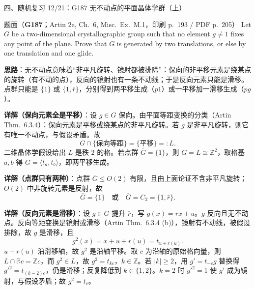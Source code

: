 \documentclass[aspectratio=169,10pt,fontset=none]{ctexbeamer}
\newcommand{\ex}[1]{\textcolor{accent}{\footnotesize\bfseries #1}}
\newcommand{\key}[1]{\textcolor{ink}{\bfseries #1}}
\begin{document}
\begin{frame}[t]{四、随机复习 12/21：G187 无不动点的平面晶体学群（上）}
\label{ex:G187}
\scriptsize
\begin{block}{\footnotesize 题面（\ex{G187}；Artin 2e, Ch.~6, Misc.\ Ex.~M.1，印刷 p.~193 / PDF p.~205）}
Let $G$ be a two-dimensional crystallographic group such that no element $g\ne1$ fixes any point of the plane. Prove that $G$ is generated by two translations, or else by one translation and one glide.
\end{block}
\key{思路}：无不动点意味着“非平凡旋转、镜射都被排除”：保向的非平移元素是绕某点的旋转（有不动的点），反向的镜射也有一条不动线；于是反向元素只能是滑移。点群只能是 $\{1\}$ 或 $\{1,\bar r\}$，分别得到两平移生成（$p1$）或一平移加一滑移生成（$pg$）。

\key{详解（保向元素全是平移）}：设 $g\in G$ 保向。由平面等距变换的分类（Artin Thm.~6.3.4）：保向元素是平移或绕某点的非平凡旋转。若 $g$ 是非平凡旋转，则它有唯一不动点，与假设矛盾。故
\[ G\cap\{\text{保向等距}\}=\{\text{平移}\}=:L . \]
二维晶体学假设给出 $L$ 是秩 $2$ 的格。若点群 $\overline G=\{1\}$，则 $G=L\cong\mathbb Z^2$，取格基 $a,b$ 得 $G=\langle t_a,t_b\rangle$，即两平移生成。

\key{详解（点群只有两种）}：点群 $\overline G\le O(2)$ 有限，且由上面论证不含非平凡旋转；$O(2)$ 中非旋转元素是反射，故
\[ \overline G=\{1\}\quad\text{或}\quad \overline G=C_2=\{1,\bar r\} . \]

\key{详解（反向元素是滑移）}：设 $g\in G$ 提升 $\bar r$，写 $g(x)=rx+u$。$g$ 反向且无不动点。反向等距变换是镜射或滑移（Artin Thm.~6.3.4 (b)），镜射有不动线，被假设排除，故 $g$ 是滑移，且
\[ g^2(x)=x+u+r(u)=t_{u+r(u)} . \]
$u+r(u)$ 沿滑移轴，故 $g^2$ 是沿轴平移。取 $c$ 为沿轴的原始格向量，则 $L\cap\mathbb R c=\mathbb Z c$，而 $g^2\in L$，故 $g^2=t_{kc}$，$k\in\mathbb Z$。若 $|k|\ge2$，用 $g'=t_{-c}g$ 替换得 $g'^2=t_{(k-2)c}$，仍是滑移；反复降低到 $k\in\{1,2\}$。$k=2$ 时 $g'^2=1$ 使 $g'$ 成为镜射，与假设矛盾；故 $g^2=t_c$。
\end{frame}
\end{document}
